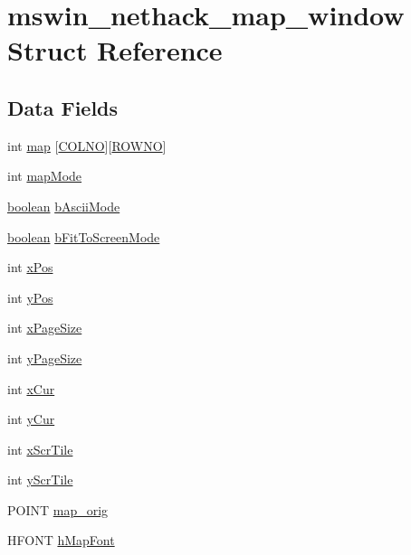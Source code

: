 \hypertarget{structmswin__nethack__map__window}{\section{mswin\+\_\+nethack\+\_\+map\+\_\+window Struct Reference}
\label{structmswin__nethack__map__window}
}
\subsection*{Data Fields}
\begin{DoxyCompactItemize}
\item 
int \hyperlink{structmswin__nethack__map__window_acca7d1798acceef6832742bd7c54083c}{map} \mbox{[}\hyperlink{gnmap_8c_a308dbfcc29f5a427c0315f3cbf03c3ed}{C\+O\+L\+N\+O}\mbox{]}\mbox{[}\hyperlink{gnmap_8c_a9cce134868d97b23c35bcf1ff4a343d8}{R\+O\+W\+N\+O}\mbox{]}
\item 
int \hyperlink{structmswin__nethack__map__window_a75b76933790e3cc4d09c9f97df1afc1d}{map\+Mode}
\item 
\hyperlink{global_8h_a531b10dd351aa162d7dcccd1966308b8}{boolean} \hyperlink{structmswin__nethack__map__window_ae71a1d1da2f65a81cdd0ea0cbad8052a}{b\+Ascii\+Mode}
\item 
\hyperlink{global_8h_a531b10dd351aa162d7dcccd1966308b8}{boolean} \hyperlink{structmswin__nethack__map__window_adcc464e3ebe6973032310a740e332bed}{b\+Fit\+To\+Screen\+Mode}
\item 
int \hyperlink{structmswin__nethack__map__window_a194bde5da5a3744d473a63513c8f0e54}{x\+Pos}
\item 
int \hyperlink{structmswin__nethack__map__window_a65f28fb66beee69ef2502198c8ed01ee}{y\+Pos}
\item 
int \hyperlink{structmswin__nethack__map__window_abd81fd3a50efd2fe1b47b2f2a86ed0a2}{x\+Page\+Size}
\item 
int \hyperlink{structmswin__nethack__map__window_a7eaf7cff55b2d986cba8ac01ef07b9a4}{y\+Page\+Size}
\item 
int \hyperlink{structmswin__nethack__map__window_aab34317edd92c7cae3930bd9ffe026c4}{x\+Cur}
\item 
int \hyperlink{structmswin__nethack__map__window_a6d0d676450acedb201f08b279667818a}{y\+Cur}
\item 
int \hyperlink{structmswin__nethack__map__window_a7fdb5eaa836b646caa95fa6b813111f6}{x\+Scr\+Tile}
\item 
int \hyperlink{structmswin__nethack__map__window_a9d566860974e604deb3eab13900fa5e7}{y\+Scr\+Tile}
\item 
P\+O\+I\+N\+T \hyperlink{structmswin__nethack__map__window_afc6012fbec67e292e844780d1d672aa4}{map\+\_\+orig}
\item 
H\+F\+O\+N\+T \hyperlink{structmswin__nethack__map__window_a80fbf3a4db2d22dca0c765a19c54ebc8}{h\+Map\+Font}
\end{DoxyCompactItemize}


